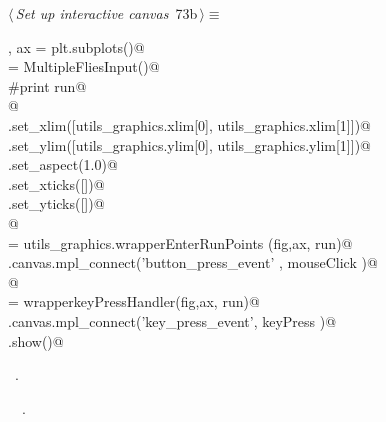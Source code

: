 \documentclass[11.5pt]{report}
\begin{document}
\vspace{-0.8cm}\newchunk 
\begin{flushleft} \small\label{scrap109}\raggedright\small
{} $\langle\,${\itshape Set up interactive canvas}\nobreak\ {\footnotesize {73b}}$\,\rangle\equiv$
\vspace{-1ex}
\begin{list}{}{} \item
\mbox{}\verb@fig, ax =  plt.subplots()@\\
\mbox{}\verb@run = MultipleFliesInput()@\\
\mbox{}\verb@#print run@\\
\mbox{}\verb@    @\\
\mbox{}\verb@ax.set_xlim([utils_graphics.xlim[0], utils_graphics.xlim[1]])@\\
\mbox{}\verb@ax.set_ylim([utils_graphics.ylim[0], utils_graphics.ylim[1]])@\\
\mbox{}\verb@ax.set_aspect(1.0)@\\
\mbox{}\verb@ax.set_xticks([])@\\
\mbox{}\verb@ax.set_yticks([])@\\
\mbox{}\verb@      @\\
\mbox{}\verb@mouseClick   = utils_graphics.wrapperEnterRunPoints (fig,ax, run)@\\
\mbox{}\verb@fig.canvas.mpl_connect('button_press_event' , mouseClick )@\\
\mbox{}\verb@      @\\
\mbox{}\verb@keyPress     = wrapperkeyPressHandler(fig,ax, run)@\\
\mbox{}\verb@fig.canvas.mpl_connect('key_press_event', keyPress   )@\\
\mbox{}\verb@plt.show()@\\
\mbox{}\verb@@{\NWsep}
\end{list}
\vspace{-1.5ex}
\footnotesize
\begin{list}{}{\setlength{\itemsep}{-\parsep}\setlength{\itemindent}{-\leftmargin}}
\item \NWtxtMacroRefIn\ .
\item \NWtxtIdentsUsed\nobreak\  \verb@wrapperkeyPressHandler@\nobreak\ .
\item{}
\end{list}
\vspace{4ex}
\end{flushleft}
\end{document}
